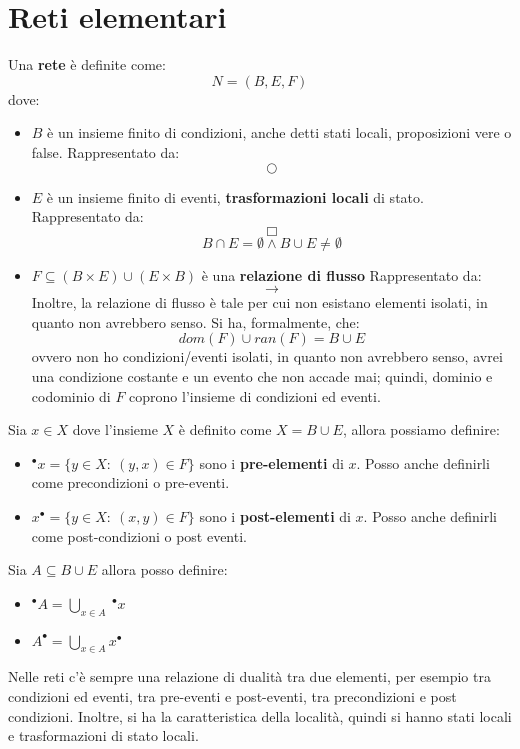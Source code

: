 \section{Reti elementari}
\begin{definizione}
    Una \textbf{rete} è definite come:
    \begin{equation}
        N = (B, E, F)
    \end{equation}
    dove:
    \begin{itemize}
        \item $B$ è un insieme finito di condizioni, anche detti stati locali,
              proposizioni vere o false. Rappresentato da: $$\bigcirc$$
        \item $E$ è un insieme finito di eventi, \textbf{trasformazioni locali}
              di stato. Rappresentato da: $$\Box$$
              \begin{equation}
                  B\cap E  = \emptyset \land B\cup E \ne \emptyset
              \end{equation}
        \item $F \subseteq (B \times E) \cup (E \times B)$ è una
              \textbf{relazione di flusso} Rappresentato da: $$\to$$
              Inoltre, la relazione di flusso è tale per cui non esistano elementi
              isolati, in quanto non avrebbero senso. Si ha, formalmente, che:
              \begin{equation}
                  dom(F) \cup ran(F) = B \cup E
              \end{equation}
              ovvero non ho condizioni/eventi isolati, in quanto non avrebbero
              senso, avrei una condizione costante e un evento che non accade
              mai; quindi, dominio e codominio di $F$ coprono l'insieme di
              condizioni ed eventi.
    \end{itemize}
\end{definizione}
Sia $x \in X$ dove l'insieme $X$ è definito come $X = B \cup E$, allora possiamo
definire:
\begin{itemize}
    \item $^{\bullet} x =\{y \in X: \ (y, x) \in F\}$ sono i \textbf{pre-elementi}
          di $x$. Posso anche definirli come precondizioni o pre-eventi.
    \item $x^{\bullet} =\{y \in X: \ (x, y) \in F\}$ sono i \textbf{post-elementi}
          di $x$. Posso anche definirli come post-condizioni o post eventi.
\end{itemize}
Sia $A \subseteq B \cup E$ allora posso definire:
\begin{itemize}
    \item $^{\bullet} A = \bigcup_{x \in A} \ ^{\bullet} x$
    \item $A^{\bullet} = \bigcup_{x \in A} x^{\bullet}$
\end{itemize}
Nelle reti c'è sempre una relazione di dualità tra due elementi, per esempio tra
condizioni ed eventi, tra pre-eventi e post-eventi, tra precondizioni e post
condizioni. Inoltre, si ha la caratteristica della località, quindi si hanno stati
locali e trasformazioni di stato locali.

